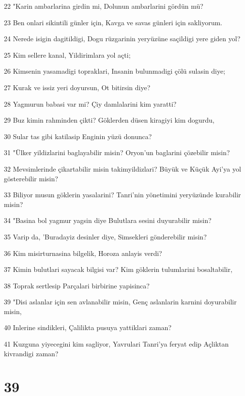 \par 22 "Karin ambarlarina girdin mi, Dolunun ambarlarini gördün mü?
\par 23 Ben onlari sikintili günler için, Kavga ve savas günleri için sakliyorum.
\par 24 Nerede isigin dagitildigi, Dogu rüzgarinin yeryüzüne saçildigi yere giden yol?
\par 25 Kim sellere kanal, Yildirimlara yol açti;
\par 26 Kimsenin yasamadigi topraklari, Insanin bulunmadigi çölü sulasin diye;
\par 27 Kurak ve issiz yeri doyursun, Ot bitirsin diye?
\par 28 Yagmurun babasi var mi? Çiy damlalarini kim yaratti?
\par 29 Buz kimin rahminden çikti? Göklerden düsen kiragiyi kim dogurdu,
\par 30 Sular tas gibi katilasip Enginin yüzü donunca?
\par 31 "Ülker yildizlarini baglayabilir misin? Oryon'un baglarini çözebilir misin?
\par 32 Mevsimlerinde çikartabilir misin takimyildizlari? Büyük ve Küçük Ayi'ya yol gösterebilir misin?
\par 33 Biliyor musun göklerin yasalarini? Tanri'nin yönetimini yeryüzünde kurabilir misin?
\par 34 "Basina bol yagmur yagsin diye Bulutlara sesini duyurabilir misin?
\par 35 Varip da, 'Buradayiz desinler diye, Simsekleri gönderebilir misin?
\par 36 Kim misirturnasina bilgelik, Horoza anlayis verdi?
\par 37 Kimin bulutlari sayacak bilgisi var? Kim göklerin tulumlarini bosaltabilir,
\par 38 Toprak sertlesip Parçalari birbirine yapisinca?
\par 39 "Disi aslanlar için sen avlanabilir misin, Genç aslanlarin karnini doyurabilir misin,
\par 40 Inlerine sindikleri, Çalilikta pusuya yattiklari zaman?
\par 41 Kuzguna yiyecegini kim sagliyor, Yavrulari Tanri'ya feryat edip Açliktan kivrandigi zaman?

\chapter{39}


